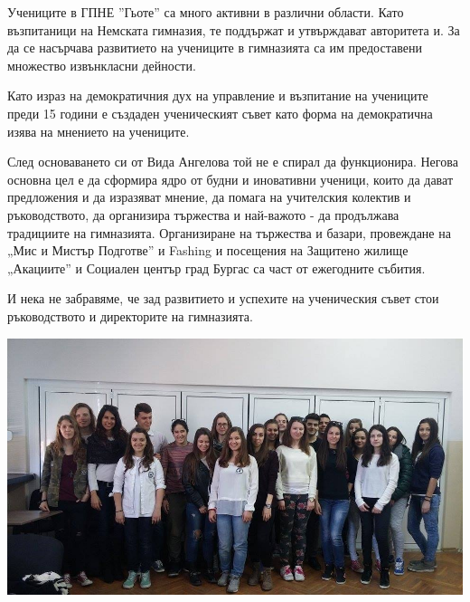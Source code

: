 \begin{multicols}{2}

Учениците в ГПНЕ ”Гьоте” са много активни в различни области. Като възпитаници на Немската гимназия, те поддържат и утвърждават авторитета и. За да се насърчава развитието на учениците в гимназията са им предоставени множество извънкласни дейности.

Като израз на демократичния дух на управление и възпитание на учениците преди 15 години е създаден ученическият съвет като форма на демократична изява на мнението на учениците.

След основаването си от Вида Ангелова той не е спирал да функционира. Негова основна цел е да сформира ядро от будни и иновативни ученици, които да дават предложения и да изразяват мнение,  да помага на учителския колектив и ръководството, да организира тържества и най-важото - да продължава традициите на гимназията. Организиране на тържества и базари, провеждане на „Мис и Мистър Подготве” и Fashing и посещения на Защитено жилище „Акациите” и Социален център град Бургас са част от ежегодните събития.

И нека не забравяме, че зад  развитието и успехите на ученическия съвет стои ръководството и директорите на гимназията.
\end{multicols}

\begin{center}
\includegraphics[width=6.0in]{./US/US.jpg}\\
\end{center}
\closearticle
